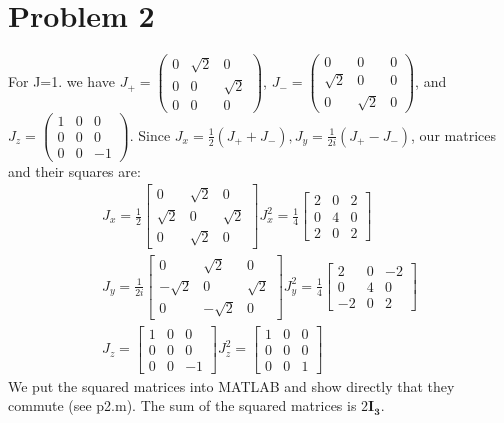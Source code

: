 \documentclass[a4paper,12pt]{article}
\numberwithin{equation}{section}
\newcommand{\bv}[1]{\mathbf{#1}}
\begin{document}
\section{Problem 2}
For J=1. we have $J_+=\left(\begin{smallmatrix}0&\sqrt{2}&0\\0&0&\sqrt{2}\\0&0&0\end{smallmatrix}\right)$,
$J_-=\left(\begin{smallmatrix}0&0&0\\ \sqrt{2}&0&0\\0&\sqrt{2}&0\end{smallmatrix}\right)$, and
$J_z=\left(\begin{smallmatrix}1&0&0\\0&0&0\\0&0&-1\end{smallmatrix}\right)$. Since $J_x=\frac{1}{2}(J_++J_-),J_y=\frac{1}{2i}(J_+-J_-)$,
our matrices and their squares are:
\begin{gather}
 J_x = \frac{1}{2}\begin{bmatrix}0&\sqrt{2}&0\\\sqrt{2}&0&\sqrt{2}\\0&\sqrt{2}&0 \end{bmatrix}
 J_x^2 = \frac{1}{4}\begin{bmatrix}2&0&2\\0&4&0\\2&0&2 \end{bmatrix}\\
 J_y = \frac{1}{2i}\begin{bmatrix}0&\sqrt{2}&0\\-\sqrt{2}&0&\sqrt{2}\\0&-\sqrt{2}&0 \end{bmatrix}
 J_y^2 = \frac{1}{4}\begin{bmatrix}2&0&-2\\0&4&0\\-2&0&2 \end{bmatrix}\\
 J_z = \begin{bmatrix}1&0&0\\0&0&0\\0&0&-1\end{bmatrix}
 J_z^2 = \begin{bmatrix}1&0&0\\0&0&0\\0&0&1\end{bmatrix}
\end{gather}
We put the squared matrices into MATLAB and show directly that they commute (see p2.m). 
The sum of the squared matrices is $2\bv{I_3}$.
\end{document}

